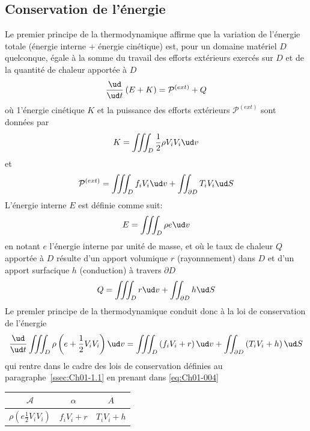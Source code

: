 \subsection{Conservation de l'énergie} \label{ssec:Ch01-3.1}
Le premier principe de la thermodynamique affirme que la variation de l'énergie totale (énergie interne + énergie cinétique) est, pour un domaine matériel $D$ quelconque, égale à la somme du travail des efforts extérieurs exercés sur $D$ et de la quantité de chaleur apportée à $D$
\begin{equation}
    \frac{\ud}{\ud t} \left( E + K \right) = \mathcal{P}^{(ext)} + Q
    \label{eq:Ch01-040}
\end{equation}
où 1'énergie cinétique $K$ et la puissance des efforts extérieurs $\mathcal{P}^{(ext)}$ sont données par
\begin{equation}
    K = \iiint_{D} \frac{1}{2} \rho V_i V_i \ud v
    \label{eq:Ch01-041}
\end{equation}
et
\begin{equation}
    \mathcal{P}^{(ext)} = \iiint_{D} f_i V_i \ud v + \iint_{\partial D} T_i V_i \ud S
    \label{eq:Ch01-042}
\end{equation}
L'énergie interne $E$ est définie comme suit:
\begin{equation}
    E = \iiint_{D} \rho e \ud v
    \label{eq:Ch01-043}
\end{equation}
en notant $e$ l'énergie interne par unité de masse, et où le taux de chaleur $Q$ apportée à $D$ résulte d'un apport volumique $r$ (rayonnnement) dans $D$ et d'un apport surfacique $h$ (conduction) à travers $\partial D$
\begin{equation}
    Q = \iiint_{D} r \ud v + \iint_{\partial D} h \ud S
    \label{eq:Ch01-044}
\end{equation}
Le premler principe de la thermodynamique conduit donc à la loi de conservation de l'énergie
\begin{equation}
    \frac{\ud}{\ud t} \iiint_D \rho \left( e + \frac{1}{2} V_i V_i \right) \ud v = \iiint_D \left( f_i V_i + r \right) \ud v + \iint_{\partial D} \left( T_i V_i + h \right) \ud S
    \label{eq:Ch01-045}
\end{equation}
qui rentre dans le cadre des lois de conservation définies au paragraphe~\ref{ssec:Ch01-1.1} en prenant
dans \eqref{eq:Ch01-004}
\begin{table}
    \centering
    \begin{tabular}[]{c|c|c}
        $\mathcal{A}$ & $\alpha$ & $A$ \\ \hline
        $\rho \left( e \frac{1}{2} V_i V_i \right)$ & $f_i V_i + r$ & $T_i V_i + h$
    \end{tabular}
\end{table}

